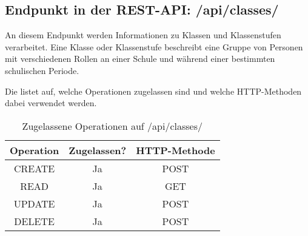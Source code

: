 \subsection{Endpunkt in der REST-API: /api/classes/}
\label{sec:end:rest:api:classes}
An diesem Endpunkt werden Informationen zu Klassen und Klassenstufen verarbeitet. Eine Klasse oder Klassenstufe beschreibt eine Gruppe von Personen mit verschiedenen Rollen an einer Schule und während einer bestimmten schulischen Periode.

Die  listet auf, welche Operationen zugelassen sind und welche HTTP-Methoden dabei verwendet werden. 

\begin{table}[!htbp]
	\begin{tabular}{|c|c|c|}
		\hline
			\textbf{Operation} & \textbf{Zugelassen?} & \textbf{HTTP-Methode} \\ \hline
			CREATE & Ja & POST \\ \hline 
			READ & Ja & GET \\ \hline
			UPDATE & Ja & POST \\ \hline 
			DELETE & Ja & POST \\ \hline
	\end{tabular}

		\caption{Zugelassene Operationen auf /api/classes/}
		\label{tab:end:rest:api:classes:meth}
\end{table}